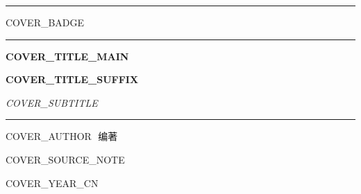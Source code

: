 
\begin{titlepage}
\thispagestyle{empty}
\pagecolor{qianhui!30}

\vspace*{28mm}
\noindent
\hfill\textcolor{zhusha}{\rule{40mm}{1pt}}\hspace{4mm}\textsf{{{COVER_BADGE}}}\hspace{4mm}\textcolor{zhusha}{\rule{40mm}{1pt}}

\vspace{4mm}
\begin{center}
{\small{}}
\end{center}

\vspace{48mm}

\begin{center}
{\color{zhusha}\Huge{}}

\vspace{10mm}

{\Huge\bfseries {{COVER_TITLE_MAIN}}}

\vspace{6mm}

{\LARGE\bfseries {{COVER_TITLE_SUFFIX}}}

\vspace{10mm}

{\large\itshape\color{shenhui} {{COVER_SUBTITLE}}}
\end{center}

\vfill

\vspace{30mm}
\begin{center}
\textcolor{zhusha}{\rule{60mm}{0.4pt}}

\vspace{6mm}
{\Large {{COVER_AUTHOR}}\,\, 编著}

\vspace{4mm}
{\small\color{shenhui} {{COVER_SOURCE_NOTE}}}

\vspace{14mm}
{\large {{COVER_YEAR_CN}}}
\end{center}

\vspace{14mm}

\clearpage
\nopagecolor
\end{titlepage}
